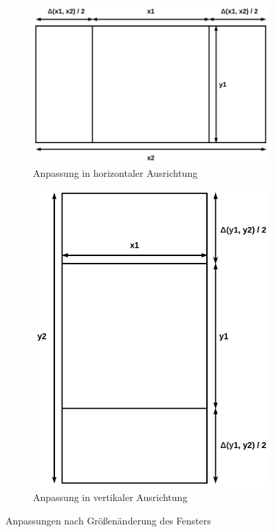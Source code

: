 \documentclass[doktyp=studarbeit]{TUBAFarbeiten}
\begin{document}
\begin{figure}[!htb]
    \centering
    \begin{subfigure}[b]{0.55\textwidth}
        \centering
        \includegraphics[width=1\linewidth]{display-2.png}
        \caption{Anpassung in horizontaler Ausrichtung}
    \end{subfigure}
    \begin{subfigure}[b]{0.4\textwidth}
        \centering
        \includegraphics[width=1\linewidth]{display-3.png}
        \caption{Anpassung in vertikaler Ausrichtung}
    \end{subfigure}
    \caption{Anpassungen nach Größenänderung des Fensters}
	\label{fig:display}
\end{figure}
\end{document}
